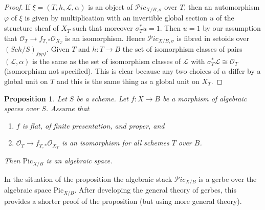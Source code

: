 \documentclass{stacks-project}
\theoremstyle{plain}
\newtheorem{proposition}[subsection]{Proposition}
\theoremstyle{definition}
\theoremstyle{remark}
\numberwithin{equation}{subsection}
\def\Sch{\mathit{Sch}}
\def\Picardstack{\mathcal{P}\!\mathit{ic}}
\def\Picardfunctor{\mathrm{Pic}}
\begin{document}
\begin{proof}
If $\xi = (T, h, \mathcal{L}, \alpha)$
is an object of $\Picardstack_{X/B, \sigma}$
over $T$, then an automorphism $\varphi$ of
$\xi$ is given by multiplication with an invertible global section $u$
of the structure sheaf of $X_T$ such that moreover $\sigma_T^*u = 1$.
Then $u = 1$ by our assumption that
$\mathcal{O}_T \to f_{T, *}\mathcal{O}_{X_T}$ is an isomorphism.
Hence $\Picardstack_{X/B, \sigma}$
is fibred in setoids over $(\Sch/S)_{fppf}$.
Given $T$ and $h : T \to B$
the set of isomorphism classes of pairs $(\mathcal{L}, \alpha)$
is the same as the set of isomorphism classes of $\mathcal{L}$
with $\sigma_T^*\mathcal{L} \cong \mathcal{O}_T$ (isomorphism
not specified). This is clear because any two choices
of $\alpha$ differ by a global unit on $T$ and this is the
same thing as a global unit on $X_T$.
\end{proof}

\begin{proposition}
\label{proposition-pic-functor}
Let $S$ be a scheme. Let $f : X \to B$ be a morphism of algebraic
spaces over $S$. Assume that
\begin{enumerate}
\item $f$ is flat, of finite presentation, and proper, and
\item $\mathcal{O}_T \to f_{T, *}\mathcal{O}_{X_T}$ is an isomorphism
for all schemes $T$ over $B$.
\end{enumerate}
Then $\Picardfunctor_{X/B}$ is an algebraic space.
\end{proposition}

\noindent
In the situation of the proposition the algebraic stack
$\Picardstack_{X/B}$ is a gerbe over the algebraic space
$\Picardfunctor_{X/B}$. After developing the general
theory of gerbes, this provides a shorter proof of
the proposition (but using more general theory).
\end{document}
